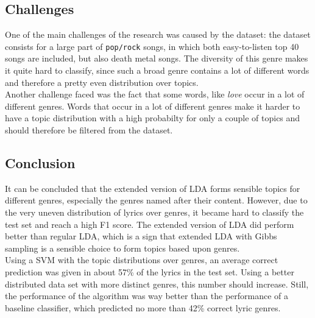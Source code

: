 \subsection{Challenges}
One of the main challenges of the research was caused by the dataset: the dataset consists for a large part of \verb|pop/rock| songs, in which both easy-to-listen top 40 songs are included, but also death metal songs. The diversity of this genre makes it quite hard to classify, since such a broad genre contains a lot of different words and therefore a pretty even distribution over topics. \\
Another challenge faced was the fact that some words, like \textit{love} occur in a lot of different genres. Words that occur in a lot of different genres make it harder to have a topic distribution with a high probabilty for only a couple of topics and should therefore be filtered from the dataset. 

\subsection{Conclusion}
It can be concluded that the extended version of LDA forms sensible topics for different genres, especially the genres named after their content. However, due to the very uneven distribution of lyrics over genres, it became hard to classify the test set and reach a high F1 score. The extended version of LDA did perform better than regular LDA, which is a sign that extended LDA with Gibbs sampling is a sensible choice to form topics based upon genres. \\
Using a SVM with the topic distributions over genres, an average correct prediction was given in about 57\% of the lyrics in the test set. Using a better distributed data set with more distinct genres, this number should increase. Still, the performance of the algorithm was way better than the performance of a baseline classifier, which predicted no more than 42\% correct lyric genres.

